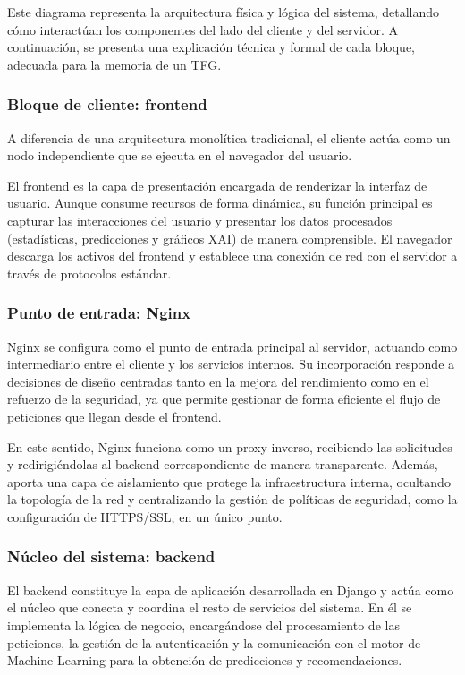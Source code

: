 Este diagrama representa la arquitectura física y lógica del sistema, detallando
cómo interactúan los componentes del lado del cliente y del servidor. A
continuación, se presenta una explicación técnica y formal de cada bloque,
adecuada para la memoria de un TFG.



\subsubsection{Bloque de cliente: frontend}

A diferencia de una arquitectura monolítica tradicional, el cliente actúa como
un nodo independiente que se ejecuta en el navegador del usuario.

El frontend es la capa de presentación encargada de renderizar la interfaz de
usuario. Aunque consume recursos de forma dinámica, su función principal es
capturar las interacciones del usuario y presentar los datos procesados
(estadísticas, predicciones y gráficos XAI) de manera comprensible. El
navegador descarga los activos del frontend y establece una conexión de red con
el servidor a través de protocolos estándar.


\subsubsection{Punto de entrada: Nginx}

Nginx se configura como el punto de entrada principal al servidor, actuando como intermediario 
entre el cliente y los servicios internos. Su incorporación responde a decisiones de diseño 
centradas tanto en la mejora del rendimiento como en el refuerzo de la seguridad, ya que permite 
gestionar de forma eficiente el flujo de peticiones que llegan desde el frontend.

En este sentido, Nginx funciona como un proxy inverso, recibiendo las solicitudes y 
redirigiéndolas al backend correspondiente de manera transparente. Además, aporta una capa 
de aislamiento que protege la infraestructura interna, ocultando la topología de la red y 
centralizando la gestión de políticas de seguridad, como la configuración de HTTPS/SSL, 
en un único punto.


\subsubsection{Núcleo del sistema: backend}
El backend constituye la capa de aplicación desarrollada en Django y actúa como el núcleo que
 conecta y coordina el resto de servicios del sistema. En él se implementa la lógica de negocio,
 encargándose del procesamiento de las peticiones, la gestión de la autenticación
  y la comunicación con el motor de Machine Learning para la obtención de predicciones y recomendaciones.

